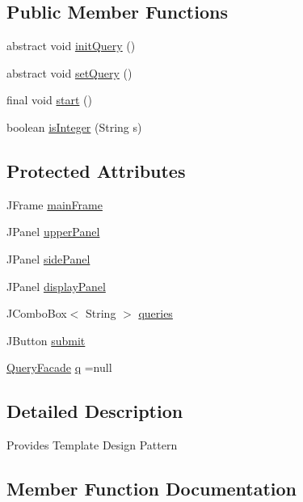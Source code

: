 \subsection*{Public Member Functions}
\begin{DoxyCompactItemize}
\item 
abstract void \hyperlink{classGUIQuery_ac2ad3b1e3b09ddc71b4df76397786553}{init\+Query} ()
\item 
abstract void \hyperlink{classGUIQuery_a5ab63c960b5a562e5daa4be87dec89e3}{set\+Query} ()
\item 
final void \hyperlink{classGUIQuery_acc9553514ecac053151c7580b83dec21}{start} ()
\item 
boolean \hyperlink{classGUIQuery_a2ffddedac70e763f8d4bfc6d24d9a0db}{is\+Integer} (String s)
\end{DoxyCompactItemize}
\subsection*{Protected Attributes}
\begin{DoxyCompactItemize}
\item 
J\+Frame \hyperlink{classGUIQuery_aba988b5bec899d53480a472de7b87dfa}{main\+Frame}
\item 
J\+Panel \hyperlink{classGUIQuery_a37a678b81901083072a73283d7acf52f}{upper\+Panel}
\item 
J\+Panel \hyperlink{classGUIQuery_a70e233b1f14874166b7707edebe825d2}{side\+Panel}
\item 
J\+Panel \hyperlink{classGUIQuery_a8b4dbf257e0859c597591f072349b75c}{display\+Panel}
\item 
J\+Combo\+Box$<$ String $>$ \hyperlink{classGUIQuery_a0db8bd960b4512cadf9aa40642934680}{queries}
\item 
J\+Button \hyperlink{classGUIQuery_a6580b15e365bc754c1a5ccdd2d58a4bb}{submit}
\item 
\hyperlink{classQueryFacade}{Query\+Facade} \hyperlink{classGUIQuery_a2a20445d749185552014142b78f3e071}{q} =null
\end{DoxyCompactItemize}


\subsection{Detailed Description}
Provides Template Design Pattern 

\subsection{Member Function Documentation}
